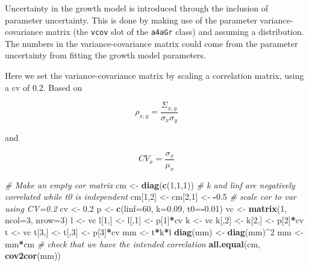 \documentclass[
]{book}
\newenvironment{Shaded}{\begin{snugshade}}{\end{snugshade}}
\newcommand{\AttributeTok}[1]{\textcolor[rgb]{0.13,0.29,0.53}{#1}}
\newcommand{\CommentTok}[1]{\textcolor[rgb]{0.56,0.35,0.01}{\textit{#1}}}
\newcommand{\DecValTok}[1]{\textcolor[rgb]{0.00,0.00,0.81}{#1}}
\newcommand{\FloatTok}[1]{\textcolor[rgb]{0.00,0.00,0.81}{#1}}
\newcommand{\FunctionTok}[1]{\textcolor[rgb]{0.13,0.29,0.53}{\textbf{#1}}}
\newcommand{\NormalTok}[1]{#1}
\newcommand{\OtherTok}[1]{\textcolor[rgb]{0.56,0.35,0.01}{#1}}
\newcommand{\SpecialCharTok}[1]{\textcolor[rgb]{0.81,0.36,0.00}{\textbf{#1}}}
\begin{document}
Uncertainty in the growth model is introduced through the inclusion of parameter uncertainty.
This is done by making use of the parameter variance-covariance matrix (the \texttt{vcov} slot of the \texttt{a4aGr} class) and assuming a distribution. The numbers in the variance-covariance matrix could come from the parameter uncertainty from fitting the growth model parameters.

Here we set the variance-covariance matrix by scaling a correlation matrix, using a cv of 0.2. Based on

\[\rho_{x,y}=\frac{\Sigma_{x,y}}{\sigma_x \sigma_y}\]

and

\[CV_x=\frac{\sigma_x}{\mu_x}\]

\begin{Shaded}
\begin{Highlighting}[]
\CommentTok{\# Make an empty cor matrix}
\NormalTok{cm }\OtherTok{\textless{}{-}} \FunctionTok{diag}\NormalTok{(}\FunctionTok{c}\NormalTok{(}\DecValTok{1}\NormalTok{,}\DecValTok{1}\NormalTok{,}\DecValTok{1}\NormalTok{))}
\CommentTok{\# k and linf are negatively correlated while t0 is independent}
\NormalTok{cm[}\DecValTok{1}\NormalTok{,}\DecValTok{2}\NormalTok{] }\OtherTok{\textless{}{-}}\NormalTok{ cm[}\DecValTok{2}\NormalTok{,}\DecValTok{1}\NormalTok{] }\OtherTok{\textless{}{-}} \SpecialCharTok{{-}}\FloatTok{0.5}
\CommentTok{\# scale cor to var using CV=0.2}
\NormalTok{cv }\OtherTok{\textless{}{-}} \FloatTok{0.2}
\NormalTok{p }\OtherTok{\textless{}{-}} \FunctionTok{c}\NormalTok{(}\AttributeTok{linf=}\DecValTok{60}\NormalTok{, }\AttributeTok{k=}\FloatTok{0.09}\NormalTok{, }\AttributeTok{t0=}\SpecialCharTok{{-}}\FloatTok{0.01}\NormalTok{)}
\NormalTok{vc }\OtherTok{\textless{}{-}} \FunctionTok{matrix}\NormalTok{(}\DecValTok{1}\NormalTok{, }\AttributeTok{ncol=}\DecValTok{3}\NormalTok{, }\AttributeTok{nrow=}\DecValTok{3}\NormalTok{)}
\NormalTok{l }\OtherTok{\textless{}{-}}\NormalTok{ vc}
\NormalTok{l[}\DecValTok{1}\NormalTok{,] }\OtherTok{\textless{}{-}}\NormalTok{ l[,}\DecValTok{1}\NormalTok{] }\OtherTok{\textless{}{-}}\NormalTok{ p[}\DecValTok{1}\NormalTok{]}\SpecialCharTok{*}\NormalTok{cv}
\NormalTok{k }\OtherTok{\textless{}{-}}\NormalTok{ vc}
\NormalTok{k[,}\DecValTok{2}\NormalTok{] }\OtherTok{\textless{}{-}}\NormalTok{ k[}\DecValTok{2}\NormalTok{,] }\OtherTok{\textless{}{-}}\NormalTok{ p[}\DecValTok{2}\NormalTok{]}\SpecialCharTok{*}\NormalTok{cv}
\NormalTok{t }\OtherTok{\textless{}{-}}\NormalTok{ vc}
\NormalTok{t[}\DecValTok{3}\NormalTok{,] }\OtherTok{\textless{}{-}}\NormalTok{ t[,}\DecValTok{3}\NormalTok{] }\OtherTok{\textless{}{-}}\NormalTok{ p[}\DecValTok{3}\NormalTok{]}\SpecialCharTok{*}\NormalTok{cv}
\NormalTok{mm }\OtherTok{\textless{}{-}}\NormalTok{ t}\SpecialCharTok{*}\NormalTok{k}\SpecialCharTok{*}\NormalTok{l}
\FunctionTok{diag}\NormalTok{(mm) }\OtherTok{\textless{}{-}} \FunctionTok{diag}\NormalTok{(mm)}\SpecialCharTok{\^{}}\DecValTok{2}
\NormalTok{mm }\OtherTok{\textless{}{-}}\NormalTok{ mm}\SpecialCharTok{*}\NormalTok{cm}
\CommentTok{\# check that we have the intended correlation}
\FunctionTok{all.equal}\NormalTok{(cm, }\FunctionTok{cov2cor}\NormalTok{(mm))}
\end{Highlighting}
\end{Shaded}
\end{document}
